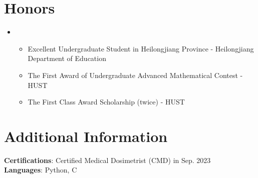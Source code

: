 \documentclass[letterpaper,11pt]{article}
\newcommand{\resumeItem}[1]{
  \item\small{
    {#1 \vspace{-2pt}}
  }
}
\newcommand{\resumeSubHeadingListStart}{\begin{itemize}[leftmargin=0.15in, label={}]}
\newcommand{\resumeSubHeadingListEnd}{\end{itemize}}
\newcommand{\resumeItemListStart}{\begin{itemize}}
\newcommand{\resumeItemListEnd}{\end{itemize}\vspace{-5pt}}
\begin{document}
\section{Honors}
\resumeSubHeadingListStart
\item{}
\resumeItemListStart
\resumeItem{Excellent Undergraduate Student in Heilongjiang Province - Heilongjiang Department of Education}
\resumeItem{The First Award of Undergraduate Advanced Mathematical Contest - HUST}
\resumeItem{The First Class Award Scholarship (twice) - HUST}
\resumeItemListEnd
\resumeSubHeadingListEnd


%
\section{Additional Information}
\begin{itemize}[leftmargin=0.15in, label={}]
\small{\item{
\textbf{Certifications}{: Certified Medical Dosimetrist (CMD) in Sep. 2023} \\
\textbf{Languages}{: Python, C} \\
}}
\end{itemize}


\end{document}
